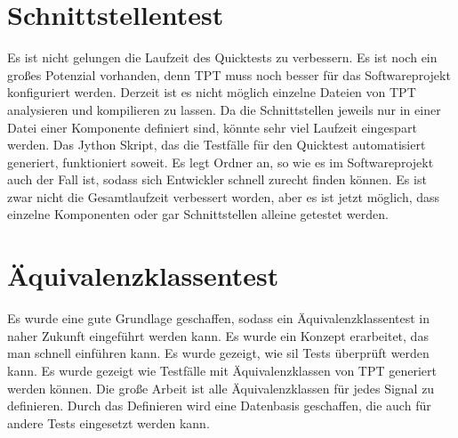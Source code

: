 \section*{Schnittstellentest}
Es ist nicht gelungen die Laufzeit des Quicktests zu verbessern.
Es ist noch ein großes Potenzial vorhanden, denn TPT muss noch besser für das Softwareprojekt konfiguriert werden.
Derzeit ist es nicht möglich einzelne Dateien von TPT analysieren und kompilieren zu lassen. Da die Schnittstellen
jeweils nur in einer Datei einer Komponente definiert sind, könnte sehr viel Laufzeit eingespart werden.
Das Jython Skript, das die Testfälle für den Quicktest automatisiert generiert, funktioniert soweit. Es legt Ordner an,
so wie es im Softwareprojekt auch der Fall ist, sodass sich Entwickler schnell zurecht finden können.
Es ist zwar nicht die Gesamtlaufzeit verbessert worden, aber es ist jetzt möglich, dass einzelne Komponenten oder gar Schnittstellen alleine getestet
werden.%



\section*{Äquivalenzklassentest}
Es wurde eine gute Grundlage geschaffen, sodass ein Äquivalenzklassentest in naher Zukunft eingeführt werden kann.
Es wurde ein Konzept erarbeitet, das man schnell einführen kann. Es wurde gezeigt, wie \ac{sil} Tests überprüft werden kann. 
Es wurde gezeigt wie Testfälle mit Äquivalenzklassen von TPT generiert werden können. Die große Arbeit ist alle
Äquivalenzklassen für jedes Signal zu definieren. Durch das Definieren wird eine Datenbasis geschaffen, die auch für
andere Tests eingesetzt werden kann. 
